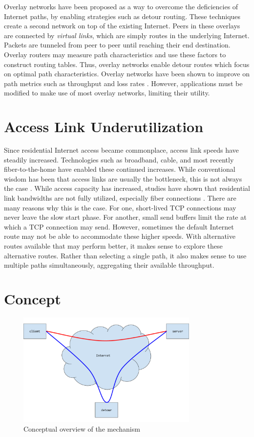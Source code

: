 \documentclass{cwru}
\begin{document}
Overlay networks have been proposed as a way to overcome the deficiencies of
Internet paths, by enabling strategies such as detour routing. These techniques
create a second network on top of the existing Internet. Peers in these overlays
are connected by \textit{virtual links}, which are simply routes in the
underlying Internet. Packets are tunneled from peer to peer until reaching their
end destination. Overlay routers may measure path characteristics and use these
factors to construct routing tables. Thus, overlay networks enable detour routes
which focus on optimal path characteristics. Overlay networks have been shown to
improve on path metrics such as throughput and loss rates \cite{detour,ron}.
However, applications must be modified to make use of most overlay networks,
limiting their utility.

\section{Access Link Underutilization}

Since residential Internet access became commonplace, access link speeds have
steadily increased. Technologies such as broadband, cable, and most recently
fiber-to-the-home have enabled these continued increases. While conventional
wisdom has been that access links are usually the bottleneck, this is not always
the case \cite{akella2003empirical}. While access capacity has increased,
studies have shown that residential link bandwidths are not fully utilized,
especially fiber connections \cite{fibertothehome}. There are many reasons why
this is the case. For one, short-lived TCP connections may never leave the slow
start phase. For another, small send buffers limit the rate at which a TCP
connection may send. However, sometimes the default Internet route may not be
able to accommodate these higher speeds. With alternative routes available that
may perform better, it makes sense to explore these alternative routes. Rather
than selecting a single path, it also makes sense to use multiple paths
simultaneously, aggregating their available throughput.

\section{Concept}

\begin{figure}
  \centering
  \includegraphics[width=0.8\textwidth]{figures/Concept.pdf}
  \caption{Conceptual overview of the mechanism}
  \label{fig:concept}
\end{figure}
\end{document}
